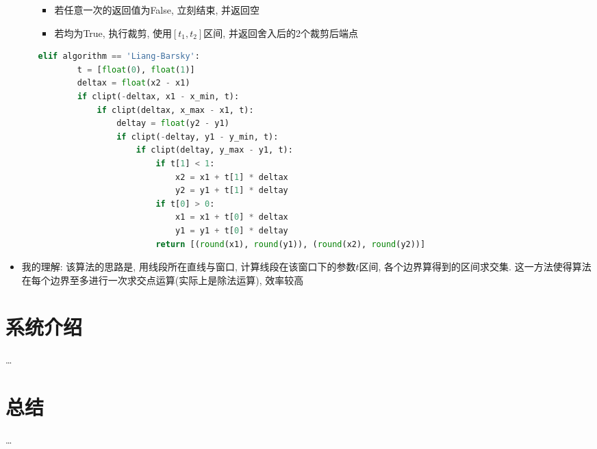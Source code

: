 \documentclass[a4paper,UTF8]{article}
\theoremstyle{definition}
\begin{document}
\begin{itemize}
\begin{enumerate}
\begin{itemize}
      \item 若任意一次的返回值为False, 立刻结束, 并返回空
      \item 若均为True, 执行裁剪, 使用$[t_1,t_2]$区间, 并返回舍入后的2个裁剪后端点
    \end{itemize}
  \begin{lstlisting}[language={Python}] 
    elif algorithm == 'Liang-Barsky':
        t = [float(0), float(1)]
        deltax = float(x2 - x1)
        if clipt(-deltax, x1 - x_min, t):
            if clipt(deltax, x_max - x1, t):
                deltay = float(y2 - y1)
                if clipt(-deltay, y1 - y_min, t):
                    if clipt(deltay, y_max - y1, t):
                        if t[1] < 1:
                            x2 = x1 + t[1] * deltax
                            y2 = y1 + t[1] * deltay
                        if t[0] > 0:
                            x1 = x1 + t[0] * deltax
                            y1 = y1 + t[0] * deltay
                        return [(round(x1), round(y1)), (round(x2), round(y2))]\end{lstlisting}
  \end{enumerate}
  \item 我的理解: 该算法的思路是, 用线段所在直线与窗口, 计算线段在该窗口下的参数$t$区间, 各个边界算得到的区间求交集. 这一方法使得算法在每个边界至多进行一次求交点运算(实际上是除法运算), 效率较高
\end{itemize}

\section{系统介绍}
\dots

\section{总结}
\dots

%

\end{document}
